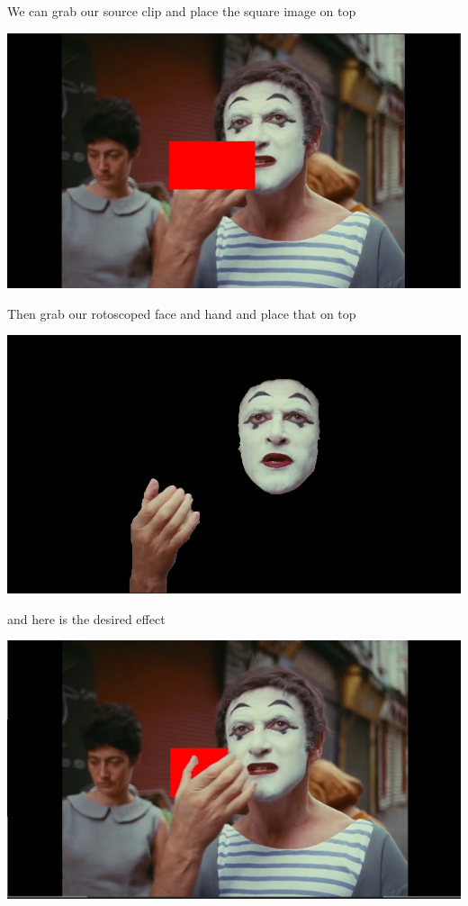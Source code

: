 \documentclass[15pt]{article}
\begin{document}
\begin{enumerate}
We can grab our source clip and place the square image on top
  \begin{center}
\includegraphics[width=.9\linewidth]{./roto/halfcomp.PNG}
\end{center}
Then grab our rotoscoped face and hand and place that on top
  \begin{center}
\includegraphics[width=.9\linewidth]{./roto/void.PNG}
\end{center}
and here is the desired effect

\begin{center}
\includegraphics[width=.9\linewidth]{./roto/behind.PNG}
\end{center}
\end{enumerate}
\end{document}
